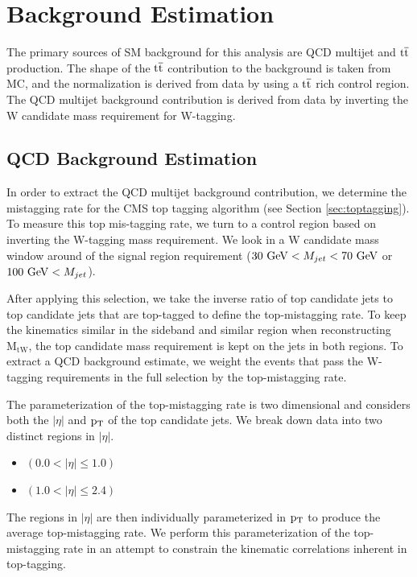 \clearpage
\newpage
\chapter{Background Estimation}
\label{sec:bsbackgroundEstimation}
The primary sources of SM background for this analysis are QCD multijet and $\mathrm{t\overline{t}}$ production. 
The shape of the $\mathrm{t\overline{t}}$ contribution to the background is taken from MC, and the normalization is derived from data by using a $\mathrm{t\overline{t}}$ rich control region.  The QCD multijet 
background contribution is derived from data by inverting the W candidate mass requirement for W-tagging.

\section{QCD Background Estimation}
\label{sec:bssideband}
\label{sec:bsqcdBackgroundEstimationProcedure}
In order to extract the QCD multijet background contribution, we determine the mistagging rate for the CMS top tagging algorithm (see Section \ref{sec:toptagging}).  
To measure this top mis-tagging rate, we turn to a control region based on inverting the W-tagging mass requirement.  We look in a W candidate mass window around of the signal region 
requirement ($30~\mathrm{GeV} < M_{jet} < 70~\mathrm{GeV}$ or $100~\mathrm{GeV} < M_{jet}$). 

After applying this selection, we take the inverse ratio of top candidate jets to top candidate jets that are top-tagged to define the top-mistagging rate.  
To keep the kinematics similar in the sideband and similar region when reconstructing $\mathrm{M_{tW}}$, the top candidate mass requirement is kept on the jets in both regions.  
To extract a QCD background estimate, we weight the events that pass the W-tagging requirements in the full selection by the top-mistagging rate.

The parameterization of the top-mistagging rate is two dimensional and considers both the $|\eta|$ and $\mathrm{p_{T}}$ of the top candidate jets.  
We break down data into two distinct regions in $|\eta|$. 


\begin{itemize}
	\item {} $(0.0 < |\eta| \leq 1.0)$
	\item {} $(1.0 < |\eta| \leq 2.4)$ 
\end{itemize}

The regions in $|\eta|$ are then individually parameterized in $\mathrm{p_{T}}$ to produce the average top-mistagging rate.  We perform this parameterization 
of the top-mistagging rate in an attempt to constrain the kinematic correlations inherent in top-tagging.

